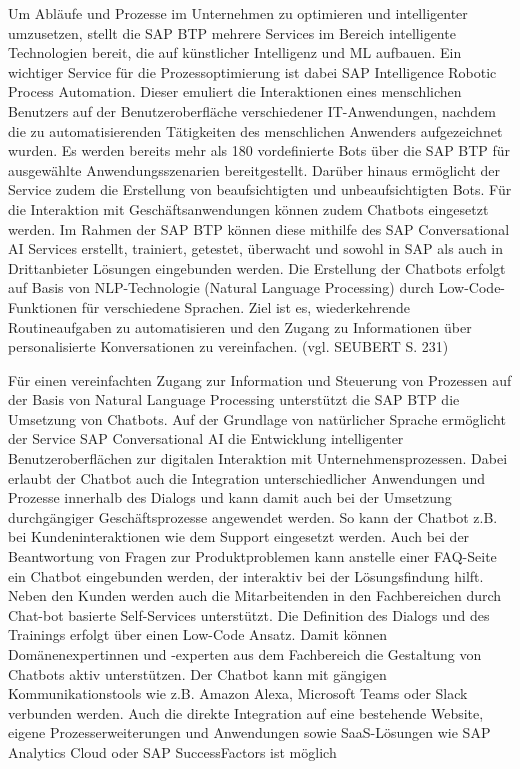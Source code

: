 Um Abläufe und Prozesse im Unternehmen zu optimieren und intelligenter umzusetzen, stellt die SAP BTP mehrere Services im Bereich intelligente Technologien bereit, die auf künstlicher Intelligenz und ML aufbauen. Ein wichtiger Service für die Prozessoptimierung ist dabei SAP Intelligence Robotic Process Automation. Dieser emuliert die Interaktionen eines menschlichen Benutzers auf der Benutzeroberfläche verschiedener IT-Anwendungen, nachdem die zu automatisierenden Tätigkeiten des menschlichen Anwenders aufgezeichnet wurden. Es werden bereits mehr als 180 vordefinierte Bots über die SAP BTP für ausgewählte Anwendungsszenarien bereitgestellt. Darüber hinaus ermöglicht der Service zudem die Erstellung von beaufsichtigten und unbeaufsichtigten Bots.
 Für die Interaktion mit Geschäftsanwendungen können zudem Chatbots eingesetzt werden. Im Rahmen der SAP BTP können diese mithilfe des SAP Conversational AI Services erstellt, trainiert, getestet, überwacht und sowohl in SAP als auch in Drittanbieter Lösungen eingebunden werden. Die Erstellung der Chatbots erfolgt auf Basis von NLP-Technologie (Natural Language Processing) durch Low-Code-Funktionen für verschiedene Sprachen. Ziel ist es, wiederkehrende Routineaufgaben zu automatisieren und den Zugang zu Informationen über personalisierte Konversationen zu vereinfachen. (vgl. SEUBERT S. 231)
 
Für einen vereinfachten Zugang zur Information und Steuerung von Prozessen auf der Basis von Natural Language Processing unterstützt die SAP BTP die Umsetzung von Chatbots. Auf der Grundlage von natürlicher Sprache ermöglicht der Service SAP Conversational AI die Entwicklung intelligenter Benutzeroberflächen zur digitalen Interaktion mit Unternehmensprozessen. Dabei erlaubt der Chatbot auch die Integration unterschiedlicher Anwendungen und Prozesse innerhalb des Dialogs und kann damit auch bei der Umsetzung durchgängiger Geschäftsprozesse angewendet werden.
So kann der Chatbot z.B. bei Kundeninteraktionen wie dem Support eingesetzt werden. Auch bei der Beantwortung von Fragen zur Produktproblemen kann anstelle einer FAQ-Seite ein Chatbot eingebunden werden, der interaktiv bei der Lösungsfindung hilft. Neben den Kunden werden auch die Mitarbeitenden in den Fachbereichen durch Chat-bot basierte Self-Services unterstützt.
Die Definition des Dialogs und des Trainings erfolgt über einen Low-Code Ansatz. Damit können Domänenexpertinnen und -experten aus dem Fachbereich die Gestaltung von Chatbots aktiv unterstützen. Der Chatbot kann mit gängigen Kommunikationstools wie z.B. Amazon Alexa, Microsoft Teams oder Slack verbunden werden. Auch die direkte Integration auf eine bestehende Website, eigene Prozesserweiterungen und Anwendungen sowie SaaS-Lösungen wie SAP Analytics Cloud oder SAP SuccessFactors ist möglich


